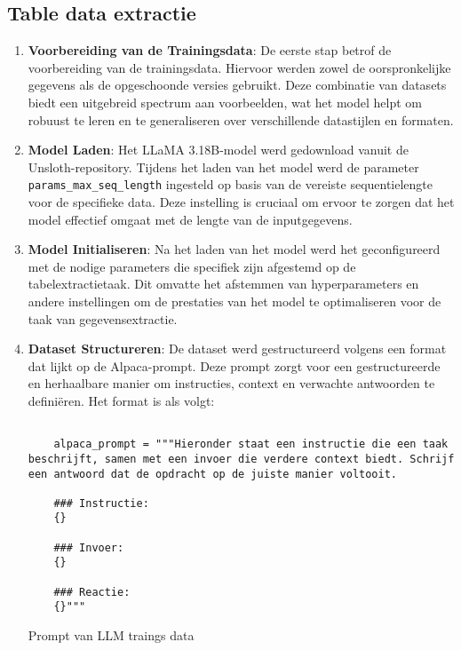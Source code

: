 \subsection{Table data extractie}
\begin{enumerate}
\item \textbf{Voorbereiding van de Trainingsdata}:
    De eerste stap betrof de voorbereiding van de trainingsdata. Hiervoor werden zowel de oorspronkelijke gegevens als de opgeschoonde versies gebruikt. Deze combinatie van datasets biedt een uitgebreid spectrum aan voorbeelden, wat het model helpt om robuust te leren en te generaliseren over verschillende datastijlen en formaten.
\item \textbf{Model Laden}:
Het LLaMA 3.18B-model werd gedownload vanuit de Unsloth-repository. Tijdens het laden van het model werd de parameter \texttt{params\_max\_seq\_length} ingesteld op basis van de vereiste sequentielengte voor de specifieke data. Deze instelling is cruciaal om ervoor te zorgen dat het model effectief omgaat met de lengte van de inputgegevens.

\item \textbf{Model Initialiseren}:
Na het laden van het model werd het geconfigureerd met de nodige parameters die specifiek zijn afgestemd op de tabelextractietaak. Dit omvatte het afstemmen van hyperparameters en andere instellingen om de prestaties van het model te optimaliseren voor de taak van gegevensextractie.

\item \textbf{Dataset Structureren}:
De dataset werd gestructureerd volgens een format dat lijkt op de Alpaca-prompt. Deze prompt zorgt voor een gestructureerde en herhaalbare manier om instructies, context en verwachte antwoorden te definiëren. Het format is als volgt:

\begin{listing}
    \begin{verbatim}

    alpaca_prompt = """Hieronder staat een instructie die een taak beschrijft, samen met een invoer die verdere context biedt. Schrijf een antwoord dat de opdracht op de juiste manier voltooit.
    
    ### Instructie:
    {}
    
    ### Invoer:
    {}
    
    ### Reactie:
    {}"""
        \end{verbatim}
        \caption{Prompt van LLM traings data}
\end{listing}


\end{enumerate}
